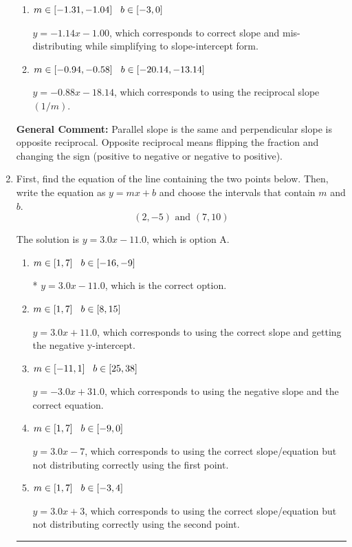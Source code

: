 \documentclass{extbook}[14pt]
\newcommand{\litem}[1]{\item #1

\rule{\textwidth}{0.4pt}}
\begin{document}
\begin{enumerate}
{\begin{enumerate}[label=\Alph*.]
 $y = 1.14x + 0.14$, which corresponds to using the negative slope.
\item \( m \in [-1.31, -1.04] \hspace*{3mm} b \in [-3, 0] \)

 $y = -1.14x - 1.00$, which corresponds to correct slope and mis-distributing while simplifying to slope-intercept form.
\item \( m \in [-0.94, -0.58] \hspace*{3mm} b \in [-20.14, -13.14] \)

 $y = -0.88x - 18.14$, which corresponds to using the reciprocal slope $(1/m)$.
\end{enumerate}

\textbf{General Comment:} Parallel slope is the same and perpendicular slope is opposite reciprocal. Opposite reciprocal means flipping the fraction and changing the sign (positive to negative or negative to positive).
}
\litem{
First, find the equation of the line containing the two points below. Then, write the equation as $ y=mx+b $ and choose the intervals that contain $m$ and $b$.
\[ (2, -5) \text{ and } (7, 10) \]

The solution is \( y = 3.0x -11.0 \), which is option A.\begin{enumerate}[label=\Alph*.]
\item \( m \in [1, 7] \hspace*{3mm} b \in [-16, -9] \)

* $y = 3.0x -11.0$, which is the correct option.
\item \( m \in [1, 7] \hspace*{3mm} b \in [8, 15] \)

 $y = 3.0x + 11.0$, which corresponds to using the correct slope and getting the negative y-intercept.
\item \( m \in [-11, 1] \hspace*{3mm} b \in [25, 38] \)

 $y = -3.0x + 31.0$, which corresponds to using the negative slope and the correct equation.
\item \( m \in [1, 7] \hspace*{3mm} b \in [-9, 0] \)

 $y = 3.0x -7$, which corresponds to using the correct slope/equation but not distributing correctly using the first point.
\item \( m \in [1, 7] \hspace*{3mm} b \in [-3, 4] \)

 $y = 3.0x + 3$, which corresponds to using the correct slope/equation but not distributing correctly using the second point.
\end{enumerate}

}
\end{enumerate}
\end{document}
